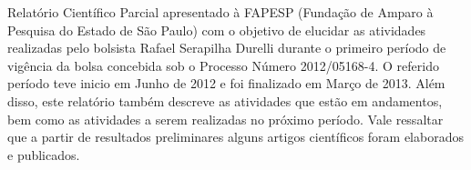  Relatório Científico Parcial apresentado à FAPESP (Fundação de Amparo à Pesquisa do Estado de São Paulo) com o objetivo de elucidar as atividades realizadas  
 pelo bolsista Rafael Serapilha Durelli durante o primeiro período de vigência da bolsa concebida sob o Processo Número 2012/05168-4. 
 O referido período teve inicio em Junho de 2012 e foi finalizado em Março de 2013. 
 Além disso, este relatório também descreve as atividades que estão em andamentos, bem como as atividades a serem realizadas no próximo período. 
 Vale ressaltar que a partir de resultados preliminares alguns artigos científicos foram elaborados e publicados.